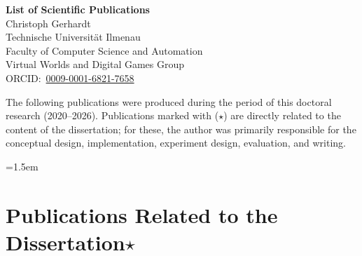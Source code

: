 \documentclass[11pt,a4paper]{article}
\begin{document}
\begin{center}
  {\LARGE\bfseries\color{tuilmenaugruen} List of Scientific Publications}\\[0.8em]
  {\large Christoph Gerhardt}\\[0.3em]
  {\normalsize Technische Universit\"at Ilmenau\\
  Faculty of Computer Science and Automation\\
  Virtual Worlds and Digital Games Group}\\[0.5em]
  {\normalsize ORCID:~\href{https://orcid.org/0009-0001-6821-7658}{0009-0001-6821-7658}}\\[1.5em]
\end{center}

\noindent
The following publications were produced during the period of this doctoral
research (2020--2026). Publications marked with ($\star$) are directly related
to the content of the dissertation; for these, the author was primarily
responsible for the conceptual design, implementation, experiment design,
evaluation, and writing.

\emergencystretch=1.5em

\section*{Publications Related to the Dissertation\hfill$\star$}
\end{document}
